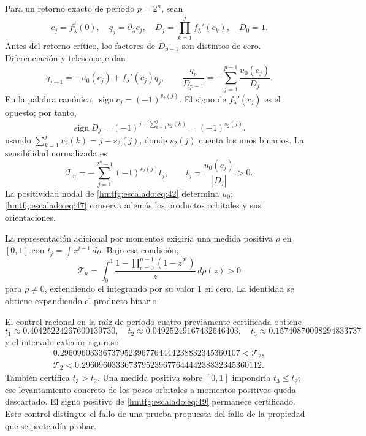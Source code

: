 Para un retorno exacto de período \(p=2^n\), sean
\[
c_j=f_\lambda^j(0),\quad q_j=\partial_\lambda c_j,\quad
D_j=\prod_{k=1}^j f_\lambda'(c_k),\quad D_0=1.
\]
Antes del retorno crítico, los factores de \(D_{p-1}\) son distintos de cero. Diferenciación y telescopaje dan
\begin{equation}
q_{j+1}=-u_0(c_j)+f_\lambda'(c_j)q_j,\qquad
\boxed{\frac{q_p}{D_{p-1}}
=-\sum_{j=1}^{p-1}\frac{u_0(c_j)}{D_j}.}
\label{hmtfg:escalado:eq:45}
\end{equation}
En la palabra canónica, \(\operatorname{sign}c_j=(-1)^{v_2(j)}\). El signo de \(f_\lambda'(c_j)\) es el opuesto; por tanto,
\begin{equation}
\operatorname{sign}D_j=(-1)^{j+\sum_{k=1}^jv_2(k)}
=(-1)^{s_2(j)},
\label{hmtfg:escalado:eq:46}
\end{equation}
usando \(\sum_{k=1}^jv_2(k)=j-s_2(j)\), donde \(s_2(j)\) cuenta los unos binarios. La sensibilidad normalizada es
\begin{equation}
\mathcal T_n=-\sum_{j=1}^{2^n-1}(-1)^{s_2(j)}t_j,\qquad
t_j=\frac{u_0(c_j)}{|D_j|}>0.
\label{hmtfg:escalado:eq:47}
\end{equation}
La positividad nodal de \eqref{hmtfg:escalado:eq:42} determina \(u_0\); \eqref{hmtfg:escalado:eq:47} conserva además los productos orbitales y sus orientaciones.

La representación adicional por momentos exigiría una medida positiva \(\rho\) en \([0,1]\) con \(t_j=\int z^{j-1}\,d\rho\). Bajo esa condición,
\begin{equation}
\mathcal T_n=\int_0^1
\frac{1-\prod_{r=0}^{n-1}(1-z^{2^r})}{z}\,d\rho(z)>0
\label{hmtfg:escalado:eq:48}
\end{equation}
para \(\rho\ne0\), extendiendo el integrando por su valor \(1\) en cero. La identidad se obtiene expandiendo el producto binario.

El control racional en la raíz de período cuatro previamente certificada obtiene
\[
t_1\approx0.40425224267600139730,\quad
t_2\approx0.04925249167432646403,\quad
t_3\approx0.15740870098294833737
\]
y el intervalo exterior riguroso
\begin{equation}
\begin{gathered}
0.296096033367379523967764444238832345360107<\mathcal T_2,\\
\mathcal T_2<0.296096033367379523967764444238832345360112.
\end{gathered}
\label{hmtfg:escalado:eq:49}
\end{equation}
También certifica \(t_3>t_2\). Una medida positiva sobre \([0,1]\) impondría \(t_3\le t_2\); ese levantamiento concreto de los pesos orbitales a momentos positivos queda descartado. El signo positivo de \eqref{hmtfg:escalado:eq:49} permanece certificado. Este control distingue el fallo de una prueba propuesta del fallo de la propiedad que se pretendía probar.
